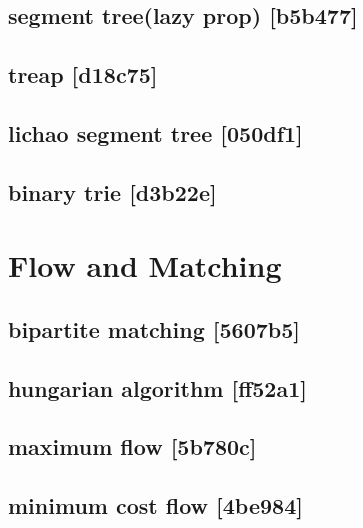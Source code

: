 \subsection{segment tree(lazy prop) {\footnotesize [b5b477]} }

\subsection{treap {\footnotesize [d18c75]} }

\subsection{lichao segment tree {\footnotesize [050df1]} }

\subsection{binary trie {\footnotesize [d3b22e]} }


\section{Flow and Matching}
\subsection{bipartite matching {\footnotesize [5607b5]} }

\subsection{hungarian algorithm {\footnotesize [ff52a1]} }

\subsection{maximum flow {\footnotesize [5b780c]} }

\subsection{minimum cost flow {\footnotesize [4be984]} }

